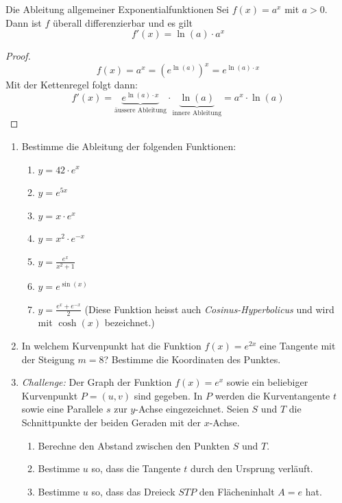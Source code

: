 \begin{satz}
	{Die Ableitung allgemeiner Exponentialfunktionen}{}
	Sei $f(x)=a^x$ mit $a>0$. Dann ist $f$ überall differenzierbar und es gilt
	$$
		f'(x)= \ln(a) \cdot a^x
	$$

\end{satz}
\begin{proof}
	$$f(x)=a^x = \left(e^{\ln(a)}\right)^x = e^{\ln(a)\cdot x} $$
	Mit der Kettenregel folgt dann:
	$$f'(x)= \underbrace{e^{\ln(a)\cdot x}}_{\text{äussere Ableitung}} \cdot \underbrace{\ln(a)}_{\text{innere Ableitung}} = a^x \cdot \ln(a)
	$$

\end{proof}

\begin{ueb}
	{}{}
	\begin{enumerate}
		\item Bestimme die Ableitung der folgenden Funktionen:
		      \begin{enumerate}
			      \item $y= 42\cdot e^x$
			      \item $y= e^{5x}$
			      \item $y= x\cdot e^x$
			      \item $y= x^2 \cdot e^{-x}$
			      \item $y= \frac{e^x}{x^2+1}$
			      \item $y= e^{\sin(x)}$
			      \item $y = \frac{e^x+e^{-x}}{2}$ (Diese Funktion heisst auch \emph{Cosinus-Hyperbolicus} und wird mit $\cosh(x)$ bezeichnet.)
		      \end{enumerate}
		\item In welchem Kurvenpunkt hat die Funktion $f(x) = e^{2x}$ eine Tangente mit der Steigung $m=8$? Bestimme die Koordinaten des Punktes.
		\item \emph{Challenge:} Der Graph der Funktion $f(x) = e^x$ sowie ein beliebiger Kurvenpunkt $P=(u,v)$ sind gegeben. In $P$ werden die Kurventangente $t$ sowie eine Parallele $s$ zur $y$-Achse eingezeichnet. Seien $S$ und $T$ die Schnittpunkte der beiden Geraden mit der $x$-Achse.
		      \begin{enumerate}
			      \item Berechne den Abstand zwischen den Punkten $S$ und $T$.
			      \item Bestimme $u$ so, dass die Tangente $t$ durch den Ursprung verläuft.
			      \item Bestimme $u$ so, dass das Dreieck $STP$ den Flächeninhalt $A=e$ hat.
		      \end{enumerate}
	\end{enumerate}
\end{ueb}
